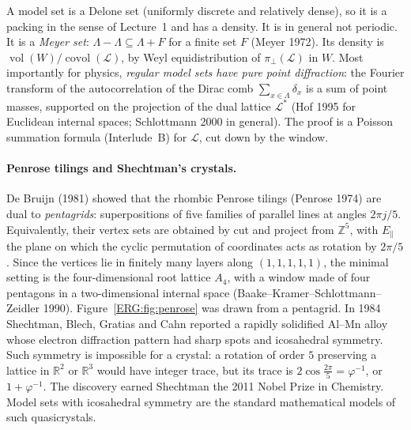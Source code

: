 \documentclass[11pt,openany]{book}
\theoremstyle{plain}
\theoremstyle{definition}
\theoremstyle{remark}
\newcommand{\R}{\mathbb{R}}
\newcommand{\Z}{\mathbb{Z}}
\newcommand{\vol}{\operatorname{vol}}
\newcommand{\covol}{\operatorname{covol}}
\begin{document}
A model set is a Delone set (uniformly discrete and relatively dense), so it is a packing in the sense of
Lecture~1 and has a density. It is in general not periodic. It is a \emph{Meyer set}:
$\Lambda-\Lambda\subseteq\Lambda+F$ for a finite set $F$ (Meyer 1972). Its density is
$\vol(W)/\covol(\mathcal L)$, by Weyl equidistribution of $\pi_\perp(\mathcal L)$ in $W$. Most importantly
for physics, \emph{regular model sets have pure point diffraction}: the Fourier transform of the
autocorrelation of the Dirac comb $\sum_{x\in\Lambda}\delta_x$ is a sum of point masses, supported on the
projection of the dual lattice $\mathcal L^*$ (Hof 1995 for Euclidean internal spaces; Schlottmann 2000
in general). The proof is a Poisson summation formula (Interlude~B) for $\mathcal L$, cut down by the
window.

\paragraph{Penrose tilings and Shechtman's crystals.} De Bruijn (1981) showed that the rhombic Penrose
tilings (Penrose 1974) are dual to \emph{pentagrids}: superpositions of five families of parallel lines
at angles $2\pi j/5$. Equivalently, their vertex sets are obtained by cut and project from $\Z^5$, with
$E_\parallel$ the plane on which the cyclic permutation of coordinates acts as rotation by $2\pi/5$. Since
the vertices lie in finitely many layers along $(1,1,1,1,1)$, the minimal setting is the
four-dimensional root lattice $A_4$, with a window made of four pentagons in a two-dimensional internal
space (Baake--Kramer--Schlottmann--Zeidler 1990). Figure~\ref{ERG:fig:penrose} was drawn from a
pentagrid. In 1984 Shechtman, Blech, Gratias and Cahn reported a rapidly
solidified Al--Mn alloy whose electron diffraction pattern had sharp spots and icosahedral symmetry. Such
symmetry is impossible for a crystal: a rotation of order $5$ preserving a lattice in $\R^2$ or $\R^3$
would have integer trace, but its trace is $2\cos\frac{2\pi}5=\varphi^{-1}$, or $1+\varphi^{-1}$. The
discovery earned Shechtman the 2011 Nobel Prize in Chemistry. Model sets with icosahedral symmetry are
the standard mathematical models of such quasicrystals.
\end{document}

